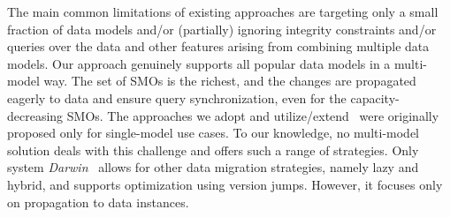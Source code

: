 The main common limitations of existing approaches are targeting only a small fraction of data models and/or (partially) ignoring integrity constraints and/or queries over the data and other features arising from combining multiple data models. Our approach genuinely supports all popular data models in a multi-model way. The set of SMOs is the richest, and the changes are propagated eagerly to data and ensure query synchronization, even for the capacity-decreasing SMOs. The approaches we adopt and utilize/extend~\citep{DBLP:conf/krdb/RundensteinerLN97,DBLP:conf/er/CaruccioPT18} were originally proposed only for single-model use cases. To our knowledge, no multi-model solution deals with this challenge and offers such a range of strategies.
Only system \textit{Darwin}~\citep{storl2022darwin} allows for other data migration strategies, namely lazy and hybrid, and supports optimization using version jumps. However, it focuses only on propagation to data instances.


